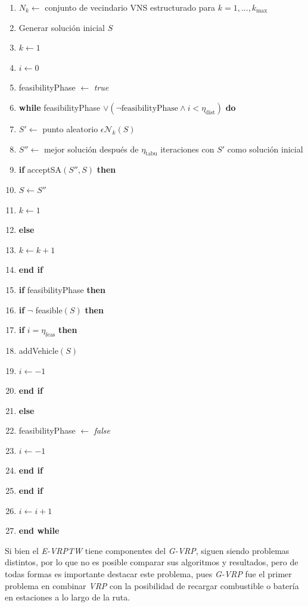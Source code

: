 \documentclass[letter, 10pt]{article}
\begin{document}
\begin{enumerate}[1:]
\item \(N_k \leftarrow\) conjunto de vecindario VNS estructurado para \(k = 1, ..., k_{\mbox{max}}\) 
\item Generar solución inicial \(S\)
\item \(k \leftarrow 1\)
\item \(i \leftarrow 0\)
\item feasibilityPhase \(\leftarrow\) \textit{true}
\item \textbf{while} feasibilityPhase 
		\(\vee (\neg \mbox{feasibilityPhase} \wedge i < \eta_{\mbox{dist}})\) \textbf{do}
\item \quad \(S' \leftarrow \) punto aleatorio \(\epsilon \mathcal{N}_k(S)\)
\item \quad \(S'' \leftarrow \) mejor solución después de \(\eta_{\mbox{tabu}}\) iteraciones
		con \(S'\) como solución inicial
\item \quad \textbf{if} acceptSA\((S'',S)\) \textbf{then}
\item \qquad \(S \leftarrow S''\)
\item \qquad \(k \leftarrow 1\)
\item \quad \textbf{else}
\item \qquad \(k \leftarrow k + 1\)
\item \quad \textbf{end if}
\item \quad \textbf{if} feasibilityPhase \textbf{then}
\item \qquad \textbf{if} \(\neg\) feasible\((S)\) \textbf{then}
\item \qquad \quad \textbf{if} \(i = \eta_{\mbox{feas}}\) \textbf{then}
\item \qquad \qquad addVehicle\((S)\)
\item \qquad \qquad \(i \leftarrow -1\)
\item \qquad \quad \textbf{end if}
\item \qquad \textbf{else}
\item \qquad \quad feasibilityPhase \(\leftarrow\) \textit{false}
\item \qquad \quad \(i \leftarrow -1\)
\item \qquad \textbf{end if}
\item \quad \textbf{end if}
\item \quad \(i \leftarrow i + 1\)
\item \textbf{end while}
\end{enumerate}

\bigskip
Si bien el \textit{E-VRPTW} tiene componentes del \textit{G-VRP}, siguen siendo problemas distintos, por lo que no es posible
comparar sus algoritmos y resultados, pero de todas formas es importante destacar este problema, pues \textit{G-VRP}
fue el primer problema en combinar \textit{VRP} con la posibilidad de recargar combustible 
o batería en estaciones a lo largo de la ruta.
\end{document}
